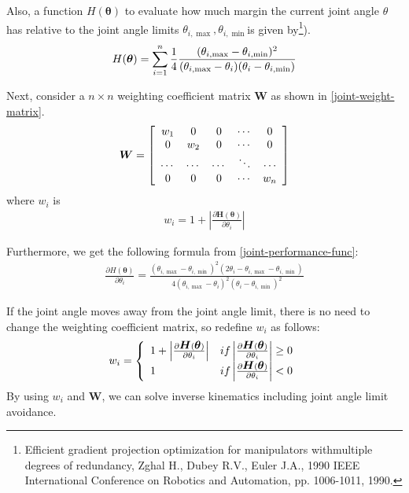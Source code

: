 Also, a function $H(\bm{\theta})$ to evaluate how much margin the current joint angle $\theta$ has relative to the joint angle limits $\theta_{i,\max}, \theta_{i, \min}$is given by\footnote{
Efficient gradient projection optimization for manipulators
withmultiple degrees of redundancy,
Zghal H., Dubey R.V., Euler J.A.,
1990  IEEE International Conference on Robotics and Automation,
pp. 1006-1011, 1990.
}).
\begin{eqnarray}
 H(\bm{\theta}) = \sum_{i = 1}^n\frac{1}{4}
  \frac{(\theta_{i,\max} - \theta_{i,\min})^2}
  {(\theta_{i,\max} - \theta_i)(\theta_i - \theta_{i,\min})}
  \eqlabel{joint-performance-func}
\end{eqnarray}

Next, consider a $n \times n$ weighting coefficient matrix $\bm{W}$ as shown in \eqref{joint-weight-matrix}.
\begin{eqnarray}
 \bm{W} = \left[
           \begin{array}{ccccc}
            w_1 & 0 & 0 & \cdots & 0 \\
            0 & w_2 & 0 & \cdots & 0 \\
            \cdots & \cdots  & \cdots & \ddots & \cdots \\
            0 & 0 & 0 & \cdots & w_n \\
           \end{array}
          \right]
 \eqlabel{joint-weight-matrix}
\end{eqnarray}
where $w_i$ is
\begin{eqnarray}
 w_i = 1 + \left|\frac{\partial \bm{H}(\bm{\theta})}{\partial \theta_i}\right|
\end{eqnarray}

Furthermore, we get the following formula from \eqref{joint-performance-func}:
\begin{eqnarray}
 \frac{\partial H(\bm{\theta})}{\partial \theta_i}
  = \frac{(\theta_{i,\max} - \theta_{i,\min})^2(2\theta_i -
  \theta_{i,\max} - \theta_{i,\min})}
  {4(\theta_{i,\max} - \theta_i)^2(\theta_i - \theta_{i,\min})^2}
\end{eqnarray}

If the joint angle moves away from the joint angle limit, there is no need to change the weighting coefficient matrix, so redefine $w_i$ as follows:
\begin{eqnarray}
 w_i =
  \left\{
   \begin{array}{l l}
   1 + \left|\frac{\partial \mbox{\boldmath{$H$}}(\mbox{\boldmath{$\theta$}})}{\partial \theta_i}\right|
    & if \left|\frac{\partial \mbox{\boldmath{$H$}}(\mbox{\boldmath{$\theta$}})}{\partial
          \theta_i}\right| \geq 0 \\
    1 & if \left|\frac{\partial \mbox{\boldmath{$H$}}(\mbox{\boldmath{$\theta$}})}{\partial
          \theta_i}\right| < 0
    \end{array}
  \right.
\end{eqnarray}
By using $w_i$ and $\bm{W}$, we can solve inverse kinematics including joint angle limit avoidance.

